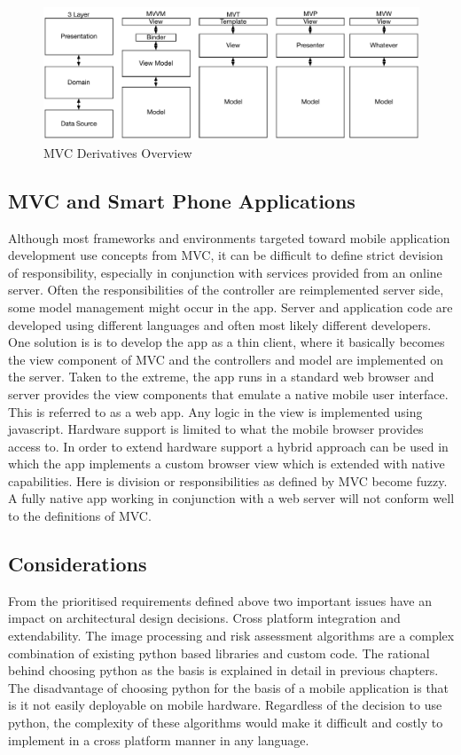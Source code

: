 \begin{figure}[H]
    \centering
    \includegraphics[height=4cm,keepaspectratio]{assets/concept/mvc_3.pdf}
    \caption{MVC Derivatives Overview}
    \label{fig:mvc_alt}
\end{figure}

\subsection{MVC and Smart Phone Applications}

Although most frameworks and environments targeted toward mobile application development use concepts from MVC, it can be difficult to define strict devision of responsibility, especially in conjunction with services provided from an online server. Often the responsibilities of the controller are reimplemented server side, some model management might occur in the app. Server and application code are developed using different languages and often most likely different developers. One solution is is to develop the app as a thin client, where it basically becomes the view component of MVC and the controllers and model are implemented on the server. Taken to the extreme, the app runs in a standard web browser and server provides the view components that emulate a native mobile user interface. This is referred to as a web app. Any logic in the view is implemented using javascript. Hardware support is limited to what the mobile browser provides access to. In order to extend hardware support a hybrid approach can be used in which the app implements a custom browser view which is extended with native capabilities. Here is division or responsibilities as defined by MVC become fuzzy. A fully native app working in conjunction with a web server will not conform well to the definitions of MVC.

\subsection{Considerations}

From the prioritised requirements defined above two important issues have an impact on architectural design decisions. Cross platform integration and extendability. The image processing and risk assessment algorithms are a complex combination of existing python based libraries and custom code. The rational behind choosing python as the basis is explained in detail in previous chapters. The disadvantage of choosing python for the basis of a mobile application is that is it not easily deployable on mobile hardware. Regardless of the decision to use python, the complexity of these algorithms would make it difficult and costly to implement in a cross platform manner in any language.

